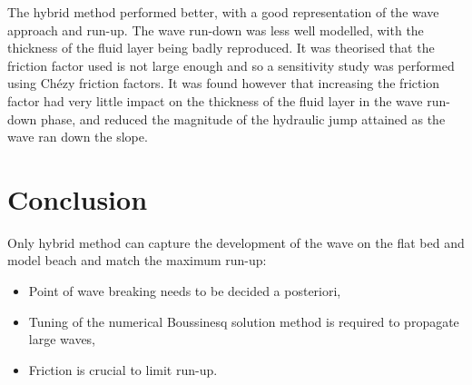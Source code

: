 The hybrid method performed better, with a good representation of the wave
approach and run-up.  The wave run-down was less well modelled, with the
thickness of the fluid layer being badly reproduced. It was theorised that the
friction factor used is not large enough and so a sensitivity study was
performed using Chézy friction factors. It was found however that increasing
the friction factor had very little impact on the thickness of the fluid layer
in the wave run-down phase, and reduced the magnitude of the hydraulic jump
attained as the wave ran down the slope.

\section{Conclusion}

Only hybrid method can capture the development of the wave on the flat bed and
model beach and match the maximum run-up:
\begin{itemize}
\item Point of wave breaking needs to be decided a posteriori,
\item Tuning of the numerical Boussinesq solution method is required to propagate large waves,
\item Friction is crucial to limit run-up.
\end{itemize}
